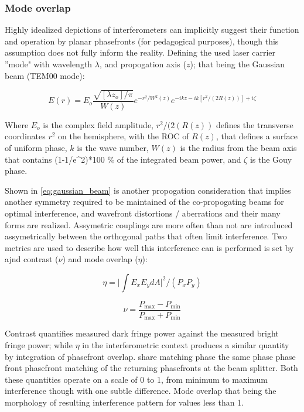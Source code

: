 \subsubsection{Mode overlap}
Highly idealized depictions of interferometers can implicitly suggest their function and operation by planar phasefronts (for pedagogical purposes), though this assumption does not fully inform the reality. Defining the used laser carrier ''mode" with wavelength $\lambda$, and propogation axis ($z$); that being the Gaussian beam (TEM00 mode):

\begin{equation}\label{eq:gaussian_beam}
E(r) = E_o \frac{\sqrt{[\lambda z_o] / \pi}}{W(z)}e^{-r^2 / W^2(z)} e^{-ikz - ik[r^2 / (2R(z))] + i \zeta}
\end{equation}

Where $E_o$ is the complex field amplitude, $r^2/(2(R(z))$ defines the transverse coordinates $r^2$ on the hemisphere, with the ROC of $R(z)$, that defines a surface of uniform phase, $k$ is the wave number, $W(z)$ is the radius from the beam axis that contains (1-1/e^2)*100 \% of the integrated beam power, and $\zeta$ is the Gouy phase.

Shown in \ref{eq:gaussian_beam} is another propogation consideration that implies another symmetry required to be maintained of the co-propogating beams for optimal interference, and wavefront distortions / aberrations and their many forms are realized. Assymetric couplings are more often than not are introduced assymetrically between the orthogonal paths that often limit interference. Two metrics are used to describe how well this interference can is performed is set by ajnd contrast ($\nu$) and mode overlap ($\eta$): 

\begin{equation}\label{eq:mode_overlap}
	\eta = \bigg|\int E_x E_y dA \bigg|^{2} \bigg/ (P_x P_y)
\end{equation}

\begin{equation}\label{eq:contrast}
	\nu = \frac{P_\mathrm{max} - P_\mathrm{min}}{P_\mathrm{max} + P_\mathrm{min}}
\end{equation}

Contrast quantifies measured dark fringe power against the measured bright fringe power; while $\eta$ in the interferometric context produces a similar quantity by integration of phasefront overlap. share matching phase the same phase phase front phasefront matching of the returning phasefronts at the beam splitter. Both these quantities operate on a scale of 0 to 1, from minimum to maximum interference though with one subtle difference. Mode overlap that being the morphology of resulting interference pattern for values less than 1. 

